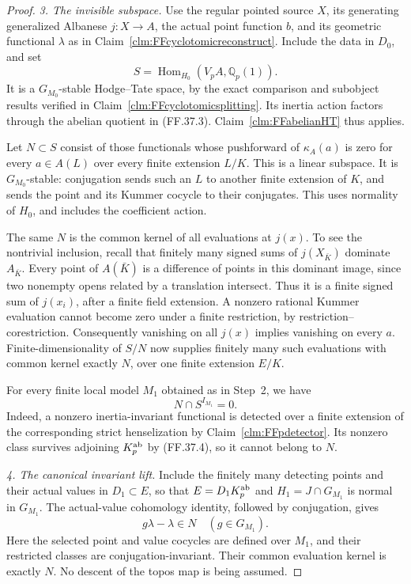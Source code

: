 \begin{proof}
\emph{3. The invisible subspace.}
Use the regular pointed source \(X\),
its generating generalized Albanese
\(j:X\to A\), the actual point function
\(b\), and its geometric functional
\(\lambda\) as in
Claim~\ref{clm:FFcyclotomicreconstruct}.
Include the data in \(D_0\), and set
\[
                   S=\operatorname{Hom}_{H_0}
                                (V_pA,\mathbb Q_p(1)).
                                                        \tag{FF.37.5}
\]
It is a \(G_{M_0}\)-stable Hodge--Tate
space, by the exact comparison and
subobject results verified in
Claim~\ref{clm:FFcyclotomicsplitting}.
Its inertia action factors through
the abelian quotient in (FF.37.3).
Claim~\ref{clm:FFabelianHT} thus applies.

Let \(N\subset S\) consist of those
functionals whose pushforward of
\(\kappa_A(a)\) is zero for every
\(a\in A(L)\) over every finite
extension \(L/K\). This is a linear
subspace. It is \(G_{M_0}\)-stable:
conjugation sends such an \(L\) to
another finite extension of \(K\),
and sends the point and its Kummer
cocycle to their conjugates. This
uses normality of \(H_0\), and
includes the coefficient action.

The same \(N\) is the common kernel
of all evaluations at \(j(x)\).
To see the nontrivial inclusion, recall
that finitely many signed sums of
\(j(X_{\bar K})\) dominate \(A_{\bar K}\).
Every point of \(A(\bar K)\) is a
difference of points in this dominant
image, since two nonempty opens related
by a translation intersect. Thus it
is a finite signed sum of \(j(x_i)\),
after a finite field extension.
A nonzero rational Kummer evaluation
cannot become zero under a finite
restriction, by restriction--corestriction.
Consequently vanishing on all \(j(x)\)
implies vanishing on every \(a\).
Finite-dimensionality of \(S/N\)
now supplies finitely many such
evaluations with common kernel
exactly \(N\), over one finite
extension \(E/K\).

For every finite local model \(M_1\)
obtained as in Step~2, we have
\[
                        N\cap S^{I_{M_1}}=0.
                                                        \tag{FF.37.6}
\]
Indeed, a nonzero inertia-invariant
functional is detected over a finite
extension of the corresponding strict
henselization by
Claim~\ref{clm:FFpdetector}. Its
nonzero class survives adjoining
\(K_p^{\rm ab}\) by (FF.37.4),
so it cannot belong to \(N\).

\emph{4. The canonical invariant lift.}
Include the finitely many detecting
points and their actual values in
\(D_1\subset E\), so that
\(E=D_1K_p^{\rm ab}\) and
\(H_1=J\cap G_{M_1}\) is normal
in \(G_{M_1}\). The actual-value
cohomology identity, followed by
conjugation, gives
\[
                  g\lambda-\lambda\in N
                         \quad(g\in G_{M_1}).
                                                        \tag{FF.37.7}
\]
Here the selected point and value
cocycles are defined over \(M_1\),
and their restricted classes are
conjugation-invariant. Their common
evaluation kernel is exactly \(N\).
No descent of the topos map is
being assumed.


\end{proof}
